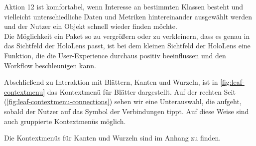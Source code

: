 \noindent Aktion 12 ist komfortabel, wenn Interesse an bestimmten Klassen besteht und vielleicht unterschiedliche Daten und Metriken hintereinander ausgewählt werden und der Nutzer ein Objekt schnell wieder finden möchte.\\

\noindent Die Möglichkeit ein Paket so zu vergrößern oder zu verkleinern, dass es genau in das Sichtfeld der HoloLens passt, ist bei dem kleinen Sichtfeld der HoloLens eine Funktion, die die User-Experience durchaus positiv beeinflussen und den Workflow beschleunigen kann.\\

\endgroup

Abschließend zu Interaktion mit Blättern, Kanten und Wurzeln, ist in \ref{fig:leaf-contextmenu} das Kontextmenü für  Blätter dargestellt. Auf der rechten Seit (\ref{fig:leaf-contextmenu-connections}) sehen wir eine Unterauswahl, die aufgeht, sobald der Nutzer auf das Symbol der Verbindungen tippt. Auf diese Weise sind auch gruppierte Kontextmenüs möglich.

Die Kontextmenüs für Kanten und Wurzeln sind im Anhang zu finden.

